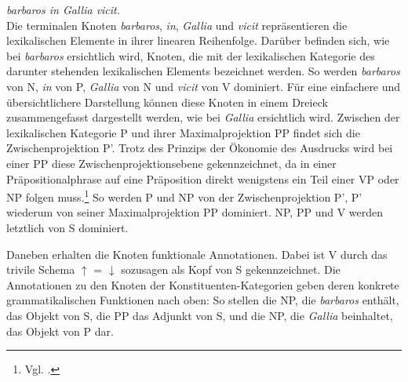 \documentclass[12pt,a4paper]{article}
\begin{document}
\textit{barbaros in Gallia vicit.} \\

Die terminalen Knoten \textit{barbaros}, \textit{in}, \textit{Gallia} und \textit{vicit} repräsentieren die lexikalischen Elemente in ihrer linearen Reihenfolge. Darüber befinden sich, wie bei \textit{barbaros} ersichtlich wird, Knoten, die mit der lexikalischen Kategorie des darunter stehenden lexikalischen Elements bezeichnet werden. So werden \textit{barbaros} von N, \textit{in} von P, \textit{Gallia} von N und \textit{vicit} von V dominiert. Für eine einfachere und übersichtlichere Darstellung können diese Knoten in einem Dreieck zusammengefasst dargestellt werden, wie bei \textit{Gallia} ersichtlich wird. Zwischen der lexikalischen Kategorie P und ihrer Maximalprojektion PP findet sich die Zwischenprojektion P'. Trotz des Prinzips der Ökonomie des Ausdrucks wird bei einer PP diese Zwischenprojektionsebene gekennzeichnet,  da in einer Präpositionalphrase auf eine Präposition direkt wenigstens ein Teil einer VP oder NP folgen muss.\footnote{Vgl. \cite{Snijders}.} So werden P und NP von der Zwischenprojektion P', P' wiederum von seiner Maximalprojektion PP dominiert. NP, PP und V werden letztlich von S dominiert.

Daneben erhalten die Knoten funktionale Annotationen. Dabei ist V durch das trivile Schema $\uparrow$ = $\downarrow$ sozusagen als Kopf von S gekennzeichnet. Die Annotationen zu den Knoten der Konstituenten-Kategorien geben deren konkrete grammatikalischen Funktionen nach oben: So stellen die NP, die \textit{barbaros} enthält, das Objekt von S, die PP das Adjunkt von S, und die NP, die \textit{Gallia} beinhaltet, das Objekt von P dar.
\end{document}
